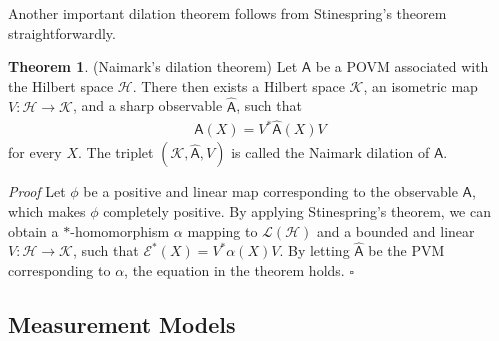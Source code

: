 \documentclass[a4paper,12pt]{wihuri}
\theoremstyle{definition}
\newtheorem{theorem}{Theorem}
\numberwithin{definition}{section}
\numberwithin{example}{section}
\numberwithin{theorem}{section}
\numberwithin{proposition}{section}
\numberwithin{lemma}{section}
\newcommand{\hi}{\mathcal{H}}%
\newcommand{\ki}{\mathcal{K}}%
\newcommand{\lin}{\mathcal{L}}%
\newcommand{\EC}{\mathcal{E}}
\newcommand{\A}{\mathsf{A}}%
\begin{document}
Another important dilation theorem follows from Stinespring's theorem straightforwardly.
\begin{theorem}(Naimark's dilation theorem)
Let $\A$ be a POVM associated with the Hilbert space $\hi$. There then exists a Hilbert space $\ki$, an isometric map $V : \hi \rightarrow \ki$, and a sharp observable $\hat{\A}$, such that 
\begin{align*}
\A(X) = V^*\hat{\A}(X)V
\end{align*} 
for every $X$. The triplet $(\ki, \hat{\A}, V)$ is called the Naimark dilation of $\A$.

\noindent \textit{Proof} Let $\phi$ be a positive and linear map corresponding to the observable $\A$, which makes $\phi$ completely positive. By applying Stinespring's theorem, we can obtain a $\ast$-homomorphism $\alpha$ mapping to $\lin(\hi)$ and a bounded and linear $V : \hi \rightarrow \ki$, such that $\EC^*(X) = V^*\alpha(X)V$. By letting $\hat{\A}$ be the PVM corresponding to $\alpha$, the equation in the theorem holds. \hfill $\square$

\end{theorem}







\subsection{Measurement Models}

\end{document}
